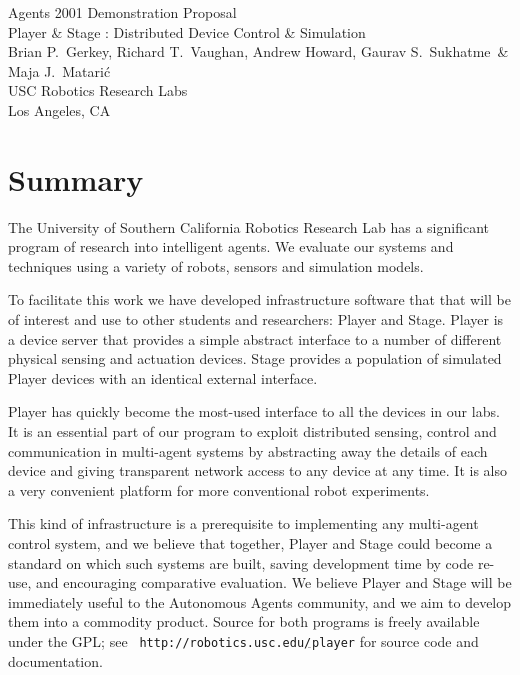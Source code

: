 \documentclass[10pt]{article}
\begin{document}
\newcommand{\richard}{{Richard T.~Vaughan}}
\newcommand{\kasper}{{Kasper St{\o}y}}
\newcommand{\gaurav}{{Gaurav S.~Sukhatme}}
\newcommand{\maja}{{Maja J.~Matari\'{c}}}
\newcommand{\brian}{{Brian P.~Gerkey}}
\newcommand{\andrew}{{Andrew Howard}}

\begin{center}
{\Large Agents 2001 Demonstration Proposal\\
\vspace*{.5em}
Player \& Stage : Distributed Device Control \& Simulation}\\
\vspace*{2em}
\brian, \richard, \andrew, \gaurav~\& \maja\\
USC Robotics Research Labs\\
Los Angeles, CA\\
\end{center}

\section*{Summary}
The University of Southern California Robotics Research Lab has a
significant program of research into intelligent agents. We evaluate
our systems and techniques using a variety of robots, sensors and
simulation models.

To facilitate this work we have developed infrastructure software that
that will be of interest and use to other students and researchers:
Player and Stage.  Player is a device server that provides a simple
abstract interface to a number of different physical sensing and
actuation devices. Stage provides a population of simulated Player
devices with an identical external interface.

Player has quickly become the most-used interface to all the devices
in our labs. It is an essential part of our program to exploit
distributed sensing, control and communication in multi-agent systems
by abstracting away the details of each device and giving transparent
network access to any device at any time. It is also a very convenient
platform for more conventional robot experiments.

This kind of infrastructure is a prerequisite to implementing any
multi-agent control system, and we believe that together, Player and
Stage could become a standard on which such systems are built, saving
development time by code re-use, and encouraging comparative
evaluation. We believe Player and Stage will be immediately useful to
the Autonomous Agents community, and we aim to develop them into a
commodity product.  Source for both programs is freely available under
the GPL; see {\tt
  http://robotics.usc.edu/\hspace{.05cm}${}_{\tilde{}}$\hspace{.05cm}player}
for source code and documentation.
\end{document}
